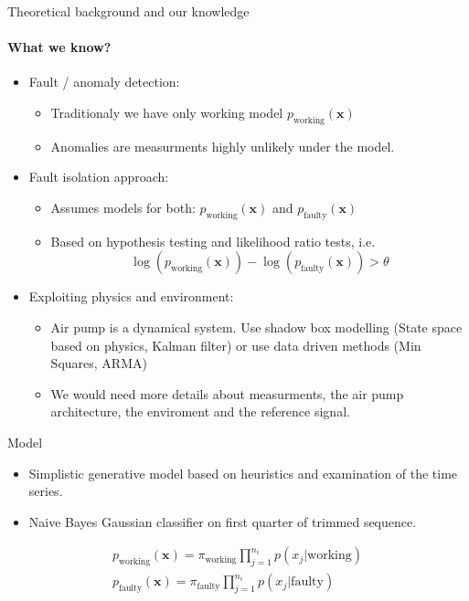 \documentclass{beamer}
\begin{document}
\begin{frame}{Theoretical background and our knowledge}
    \framesubtitle{What we know?}
    
    \begin{itemize}
        \item Fault / anomaly detection:
        \begin{itemize}
            \item Traditionaly we have only working model $p_{\text{working}}(\boldsymbol{x})$
            \item Anomalies are measurments highly unlikely under the model.
        \end{itemize}
        
        \item Fault isolation approach:
            \begin{itemize}
                \item Assumes models for both: $p_{\text{working}}(\boldsymbol{x})$ and $p_{\text{faulty}}(\boldsymbol{x})$
                \item Based on hypothesis testing and likelihood ratio tests, i.e. 
                $$\log(p_{\text{working}}(\boldsymbol{x})) - \log(p_{\text{faulty}}(\boldsymbol{x})) > \theta$$
            \end{itemize}
        
        \item Exploiting physics and environment:
            \begin{itemize}
                \item Air pump is a dynamical system. Use shadow box modelling (State space based on physics, Kalman filter) or use data driven methods (Min Squares, ARMA)
                \item We would need more details about measurments, the air pump architecture, the enviroment and the reference signal.
            \end{itemize}
    \end{itemize}
\end{frame}


\begin{frame}{Model}
    \begin{itemize}
        \item Simplistic generative model based on heuristics and examination of the time series.
        \item Naive Bayes Gaussian classifier on first quarter of trimmed sequence.
    \end{itemize}
    \begin{align*}
    p_{\text{working}}(\boldsymbol{x}) = \pi_{\text{working}} \prod_{j=1}^{n_i}p(x_j| \text{working}) \\
    p_{\text{faulty}}(\boldsymbol{x}) =  \pi_{\text{faulty}} \prod_{j=1}^{n_i}p(x_j| \text{faulty}) 
    \end{align*}
\end{frame}
\end{document}

